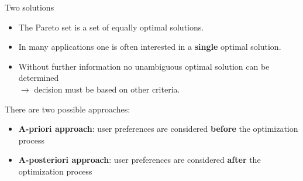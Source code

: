 \begin{frame}{Two solutions}

\begin{itemize}
\item The Pareto set is a set of equally optimal solutions.
\item In many applications one is often interested in a \textbf{single} optimal solution.
\item Without further information no unambiguous optimal solution can be determined \\
$\to$ decision must be based on other criteria.
\end{itemize}

There are two possible approaches:
\begin{itemize}
\item \textbf{A-priori approach}: user preferences are considered \textbf{before} the optimization process
\item \textbf{A-posteriori approach}: user preferences are considered \textbf{after} the optimization process
\end{itemize}

\end{frame}

